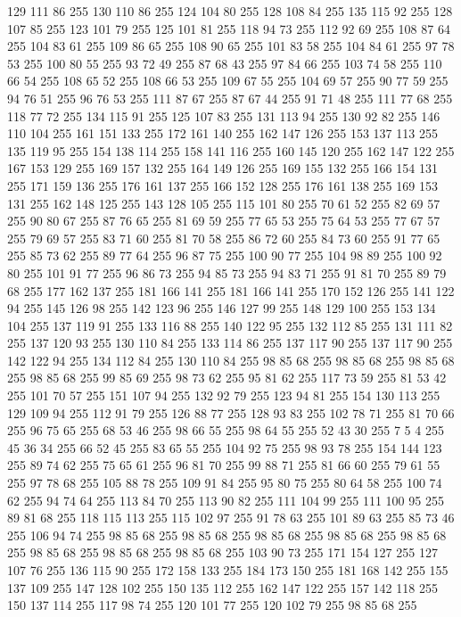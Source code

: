 129 111 86 255 130 110 86 255 124 104 80 255 128 108 84 255 135 115 92 255 128 107 85 255 123 101 79 255 125 101 81 255 118 94 73 255 112 92 69 255 108 87 64 255 104 83 61 255 109 86 65 255 108 90 65 255 101 83 58 255 104 84 61 255 97 78 53 255 100 80 55 255 93 72 49 255 87 68 43 255 97 84 66 255 103 74 58 255 110 66 54 255 108 65 52 255 108 66 53 255 109 67 55 255 104 69 57 255 90 77 59 255 94 76 51 255 96 76 53 255 111 87 67 255 87 67 44 255 91 71 48 255 111 77 68 255 118 77 72 255 134 115 91 255 125 107 83 255 131 113 94 255 130 92 82 255 146 110 104 255 161 151 133 255 172 161 140 255 162 147 126 255 153 137 113 255 135 119 95 255 154 138 114 255 158 141 116 255 160 145 120 255 162 147 122 255 167 153 129 255 169 157 132 255 164 149 126 255 169 155 132 255 166 154 131 255 171 159 136 255 176 161 137 255 166 152 128 255 176 161 138 255 169 153 131 255 162 148 125 255 143 128 105 255 115 101 80 255 70 61 52 255 82 69 57 255
90 80 67 255 87 76 65 255 81 69 59 255 77 65 53 255 75 64 53 255 77 67 57 255 79 69 57 255 83 71 60 255 81 70 58 255 86 72 60 255 84 73 60 255 91 77 65 255 85 73 62 255 89 77 64 255 96 87 75 255 100 90 77 255 104 98 89 255 100 92 80 255 101 91 77 255 96 86 73 255 94 85 73 255 94 83 71 255 91 81 70 255 89 79 68 255 177 162 137 255 181 166 141 255 181 166 141 255 170 152 126 255 141 122 94 255 145 126 98 255 142 123 96 255 146 127 99 255 148 129 100 255 153 134 104 255 137 119 91 255 133 116 88 255 140 122 95 255 132 112 85 255 131 111 82 255 137 120 93 255 130 110 84 255 133 114 86 255 137 117 90 255 137 117 90 255 142 122 94 255 134 112 84 255 130 110 84 255 98 85 68 255 98 85 68 255 98 85 68 255 98 85 68 255 99 85 69 255 98 73 62 255 95 81 62 255 117 73 59 255 81 53 42 255 101 70 57 255 151 107 94 255 132 92 79 255 123 94 81 255 154 130 113 255 129 109 94 255 112 91 79 255 126 88 77 255
128 93 83 255 102 78 71 255 81 70 66 255 96 75 65 255 68 53 46 255 98 66 55 255 98 64 55 255 52 43 30 255 7 5 4 255 45 36 34 255 66 52 45 255 83 65 55 255 104 92 75 255 98 93 78 255 154 144 123 255 89 74 62 255 75 65 61 255 96 81 70 255 99 88 71 255 81 66 60 255 79 61 55 255 97 78 68 255 105 88 78 255 109 91 84 255 95 80 75 255 80 64 58 255 100 74 62 255 94 74 64 255 113 84 70 255 113 90 82 255 111 104 99 255 111 100 95 255 89 81 68 255 118 115 113 255 115 102 97 255 91 78 63 255 101 89 63 255 85 73 46 255 106 94 74 255 98 85 68 255 98 85 68 255 98 85 68 255 98 85 68 255 98 85 68 255 98 85 68 255 98 85 68 255 98 85 68 255 103 90 73 255 171 154 127 255 127 107 76 255 136 115 90 255 172 158 133 255 184 173 150 255 181 168 142 255 155 137 109 255 147 128 102 255 150 135 112 255 162 147 122 255 157 142 118 255 150 137 114 255 117 98 74 255 120 101 77 255 120 102 79 255 98 85 68 255

